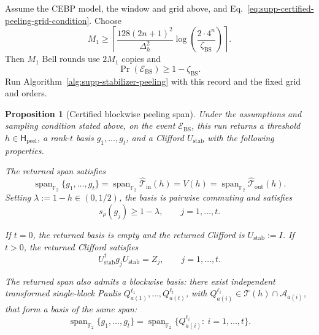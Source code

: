 \documentclass[
  aps,
  prx,
  reprint,
  superscriptaddress,
  amsmath,
  amssymb,
  nofootinbib,
  longbibliography
]{revtex4-2}
\newtheorem{proposition}[theorem]{Proposition}
\newcommand{\Span}{\operatorname{span}}
\newcommand{\Fc}{\mathbb{F}_2}
\begin{document}
Assume the CEBP model, the window and grid above, and
Eq.~\eqref{eq:supp-certified-peeling-grid-condition}.  Choose
\begin{equation}
M_1
\ge
\left\lceil
\frac{128(2n+1)^2}{\Delta_h^2}
\log\!\left(\frac{2\cdot 4^n}{\zeta_{\mathrm{BS}}}\right)
\right\rceil.
\label{eq:supp-certified-peeling-bell-round-count}
\end{equation}
Then $M_1$ Bell rounds use $2M_1$ copies and
\begin{equation}
\Pr(\mathcal E_{\mathrm{BS}})
\ge
1-\zeta_{\mathrm{BS}}.
\label{eq:supp-certified-peeling-event-probability}
\end{equation}
Run Algorithm~\ref{alg:supp-stabilizer-peeling} with this record and the
fixed grid and orders.

\begin{proposition}[Certified blockwise peeling span]
\label{prop:supp-certified-blockwise-peeling-span}
Under the assumptions and sampling condition stated above, on the event
$\mathcal E_{\mathrm{BS}}$, this run returns a threshold
$h\in\mathsf H_{\mathrm{peel}}$, a rank-$t$ basis $g_1,\dots,g_t$, and a Clifford
$U_{\mathrm{stab}}$ with the following properties.

The returned span satisfies
\begin{equation}
\Span_{\Fc}\{g_1,\dots,g_t\}
=
\Span_{\Fc}\widehat{\mathcal T}_{\mathrm{in}}(h)
=
V(h)
=
\Span_{\Fc}\widehat{\mathcal T}_{\mathrm{out}}(h).
\label{eq:supp-certified-peeling-returned-common-span}
\end{equation}
Setting $\lambda:=1-h\in(0,1/2)$, the basis is pairwise commuting and
satisfies
\begin{equation}
s_\rho(g_j)\ge 1-\lambda,
\qquad
j=1,\dots,t.
\label{eq:supp-certified-peeling-generator-score}
\end{equation}

If $t=0$, the returned basis is empty and the returned Clifford is
$U_{\mathrm{stab}}:=I$.  If $t>0$, the returned Clifford satisfies
\begin{equation}
U_{\mathrm{stab}}^\dagger g_jU_{\mathrm{stab}}=Z_j,
\qquad
j=1,\dots,t.
\end{equation}

The returned span also admits a blockwise basis: there exist independent
transformed single-block Paulis
$Q_{a(1)}^{\ell_1},\dots,Q_{a(t)}^{\ell_t}$, with
$Q_{a(i)}^{\ell_i}\in\mathcal T(h)\cap\mathcal A_{a(i)}$, that form a
basis of the same span:
\begin{equation}
\Span_{\Fc}\{g_1,\dots,g_t\}
=
\Span_{\Fc}
\bigl\{
Q_{a(i)}^{\ell_i}:\ i=1,\dots,t
\bigr\}.
\label{eq:supp-certified-peeling-single-block-span}
\end{equation}
\end{proposition}
\end{document}
